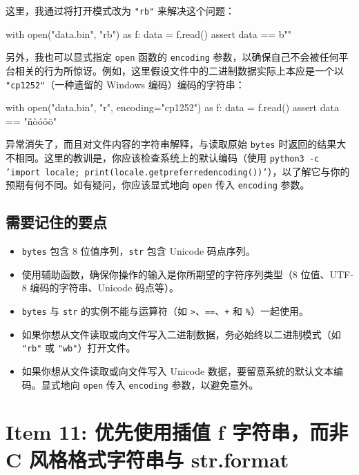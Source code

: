 这里，我通过将打开模式改为 \texttt{"rb"} 来解决这个问题：

\begin{codebox}[python]
with open("data.bin", "rb") as f:
    data = f.read()
assert data == b""
\end{codebox}

另外，我也可以显式指定 \texttt{open} 函数的 \texttt{encoding} 参数，以确保自己不会被任何平台相关的行为所惊讶。例如，这里假设文件中的二进制数据实际上本应是一个以 \texttt{"cp1252"}（一种遗留的 Windows 编码）编码的字符串：

\begin{codebox}[python]
with open("data.bin", "r", encoding="cp1252") as f:
    data = f.read()
assert data == "ñòóôõ"
\end{codebox}

异常消失了，而且对文件内容的字符串解释，与读取原始 \texttt{bytes} 时返回的结果大不相同。这里的教训是，你应该检查系统上的默认编码（使用 \texttt{python3 -c 'import locale; print(locale.getpreferredencoding())'}），以了解它与你的预期有何不同。如有疑问，你应该显式地向 \texttt{open} 传入 \texttt{encoding} 参数。

\subsection{需要记住的要点}

\begin{itemize}
\item \texttt{bytes} 包含 8 位值序列，\texttt{str} 包含 Unicode 码点序列。
\item 使用辅助函数，确保你操作的输入是你所期望的字符序列类型（8 位值、UTF-8 编码的字符串、Unicode 码点等）。
\item \texttt{bytes} 与 \texttt{str} 的实例不能与运算符（如 \texttt{>}、\texttt{==}、\texttt{+} 和 \texttt{\%}）一起使用。
\item 如果你想从文件读取或向文件写入二进制数据，务必始终以二进制模式（如 \texttt{"rb"} 或 \texttt{"wb"}）打开文件。
\item 如果你想从文件读取或向文件写入 Unicode 数据，要留意系统的默认文本编码。显式地向 \texttt{open} 传入 \texttt{encoding} 参数，以避免意外。
\end{itemize}

\section{Item 11: 优先使用插值 f 字符串，而非 C 风格格式字符串与 str.format}

